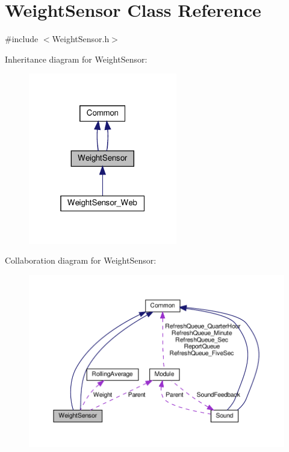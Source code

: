 \hypertarget{class_weight_sensor}{}\section{Weight\+Sensor Class Reference}
\label{class_weight_sensor}


{\ttfamily \#include $<$Weight\+Sensor.\+h$>$}



Inheritance diagram for Weight\+Sensor\+:
\nopagebreak
\begin{figure}[H]
\begin{center}
\leavevmode
\includegraphics[width=184pt]{class_weight_sensor__inherit__graph}
\end{center}
\end{figure}


Collaboration diagram for Weight\+Sensor\+:
\nopagebreak
\begin{figure}[H]
\begin{center}
\leavevmode
\includegraphics[width=350pt]{class_weight_sensor__coll__graph}
\end{center}
\end{figure}
